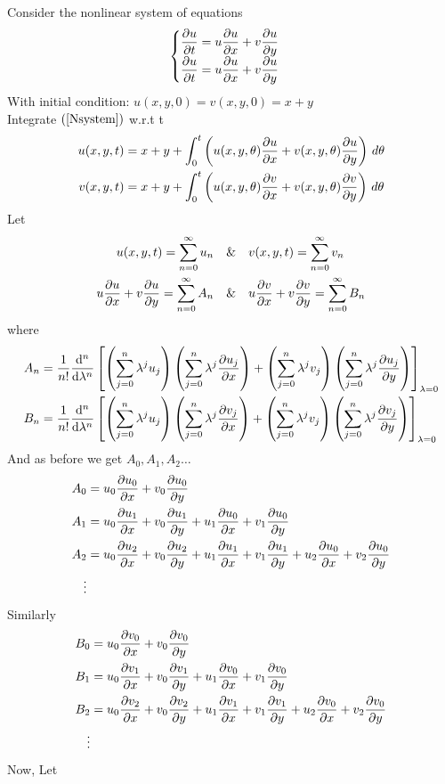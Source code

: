 \documentclass[]{article}
\begin{document}
Consider the nonlinear system of equations\\
\begin{equation}
    \label{Nsystem}
    \begin{cases}
         \displaystyle \pdv{u}{t}= u\pdv{u}{x} + v\pdv{u}{y}
         \\
         \displaystyle \pdv{u}{t}= u\pdv{u}{x} + v\pdv{u}{y}
     \end{cases}
 \end{equation}
 With initial condition: $u(x,y,0)=v(x,y,0)=x+y$ \\
Integrate $(\ref{Nsystem})$ w.r.t t\\
\begin{align*} 
    u(x,y,t) &=x+y + \int_0^{t}\left( u(x,y,\theta)\pdv{u}{x} + v(x,y,\theta)\pdv{u}{y} \right)\, d\theta \\
    v(x,y,t) &=x+y + \int_0^{t}\left(u(x,y,\theta)\pdv{v}{x} + v(x,y,\theta)\pdv{v}{y} \right) \, d\theta
\end{align*}
Let\\
\begin{align*}
    u(x,y,t) = \sum_{n=0}^\infty u_n \quad&\&\quad v(x,y,t) = \sum_{n=0}^\infty v_n\\
    u\pdv{u}{x}+v\pdv{u}{y} =\sum_{n=0}^\infty A_n \quad&\&\quad u\pdv{v}{x}+v\pdv{v}{y} =\sum_{n=0}^\infty B_n 
\end{align*}
where
\begin{align*}
    A_n &= \frac{1}{n!} \dv[n]{}{\lambda}\left[\left(\sum_{j=0}^{n} \lambda^j u_j\right)\left(\sum_{j=0}^{n} \lambda^j \pdv{u_j}{x}\right)+ \left(\sum_{j=0}^{n} \lambda^j v_j\right)\left(\sum_{j=0}^{n} \lambda^j \pdv{u_j}{y}\right)\right]_{\lambda=0}\\
    B_n &= \frac{1}{n!} \dv[n]{}{\lambda}\left[\left(\sum_{j=0}^{n} \lambda^j u_j\right)\left(\sum_{j=0}^{n} \lambda^j \pdv{v_j}{x}\right)+ \left(\sum_{j=0}^{n} \lambda^j v_j\right)\left(\sum_{j=0}^{n} \lambda^j \pdv{v_j}{y}\right)\right]_{\lambda=0}
\end{align*}
And as before we get $A_0,A_1,A_2\dots$
\begin{align*}
    A_0 &= u_0 \pdv{u_0}{x}+v_0 \pdv{u_0}{y}
    \\
    A_1 &= u_0 \pdv{u_1}{x} + v_0 \pdv{u_1}{y} + u_1 \pdv{u_0}{x} + v_1 \pdv{u_0}{y}
    \\
    A_2 &= u_0 \pdv{u_2}{x} + v_0 \pdv{u_2}{y} + u_1 \pdv{u_1}{x} + v_1 \pdv{u_1}{y} + u_2 \pdv{u_0}{x} + v_2 \pdv{u_0}{y} 
    \\
    \vdots
\end{align*}
Similarly
\begin{align*}
    B_0 &= u_0 \pdv{v_0}{x}+v_0 \pdv{v_0}{y}
    \\
    B_1 &= u_0 \pdv{v_1}{x} + v_0 \pdv{v_1}{y} + u_1 \pdv{v_0}{x} + v_1 \pdv{v_0}{y}
    \\
   B_2 &= u_0 \pdv{v_2}{x} + v_0 \pdv{v_2}{y} + u_1 \pdv{v_1}{x} + v_1 \pdv{v_1}{y} + u_2 \pdv{v_0}{x} + v_2 \pdv{v_0}{y} 
    \\
    \vdots
\end{align*}
Now, Let 
 
\end{document}
